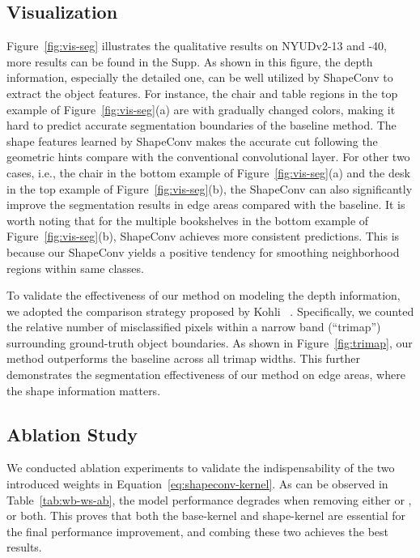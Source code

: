 \subsection{Visualization}
\vspace{-0.2cm}
Figure~\ref{fig:vis-seg} illustrates the qualitative results on NYUDv2-13 and -40, more results can be found in the Supp. As shown in this figure, the depth information, especially the detailed one, can be well utilized by ShapeConv to extract the object features. For instance, the chair and table regions in the top example of Figure~\ref{fig:vis-seg}(a) are with gradually changed colors, making it hard to predict accurate segmentation boundaries of the baseline method. The shape features learned by ShapeConv makes the accurate cut following the geometric hints compare with the conventional convolutional layer. For other two cases, i.e., the chair in the bottom example of Figure~\ref{fig:vis-seg}(a) and the desk in the top example of Figure~\ref{fig:vis-seg}(b), the ShapeConv can also significantly improve the segmentation results in edge areas compared with the baseline. It is worth noting that for the multiple bookshelves in the bottom example of Figure~\ref{fig:vis-seg}(b), ShapeConv achieves more consistent predictions. This is because our ShapeConv yields a positive tendency for smoothing neighborhood regions within same classes.


To validate the effectiveness of our method on modeling the depth information, we adopted the comparison strategy proposed by Kohli \etal~\cite{kohli2009robust}. Specifically, we counted the relative number of misclassified pixels within a narrow band (``trimap'') surrounding ground-truth object boundaries. As shown in Figure~\ref{fig:trimap}, our method outperforms the baseline across all trimap widths. This further demonstrates the segmentation effectiveness of our method on edge areas, where the shape information matters.

\vspace{-0.1cm}
\subsection{Ablation Study}
\vspace{-0.2cm}
We conducted ablation experiments to validate the indispensability of the two introduced weights in Equation~\ref{eq:shapeconv-kernel}. As can be observed in Table~\ref{tab:wb-ws-ab}, the model performance degrades when removing either  or , or both. This proves that both the base-kernel and shape-kernel are essential for the final performance improvement, and combing these two achieves the best results.

